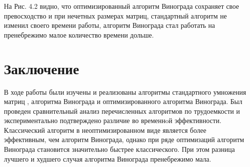 \documentclass[a4paper,12pt]{report}
\begin{document}
На Рис. 4.2 видно, что оптимизированный алгоритм Винограда сохраняет свое превосходство и при нечетных размерах матриц, стандартный алгоритм не изменил своего времени работы, алгоритм Винограда стал работать на пренебрежимо малое количество времени дольше.

\newpage
\chapter*{Заключение}
\hspace{0.6cm}В ходе работы были изучены и реализованы алгоритмы стандартного умножения матриц , алгоритма Винограда и оптимизированного алгоритма Винограда. Был проведен сравнительный анализ перечисленных алгоритмов по трудоемкости и экспериментально подтверждено различие во временнoй эффективности. Классический алгоритм в неоптимизированном виде является более эффективным, чем алгоритм Винограда, однако при ряде оптимизаций алгоритм Винограда становится значительно быстрее классического. При этом разница лучшего и худшего случая алгоритма Винограда пренебрежимо мала.
       
\end{document}
